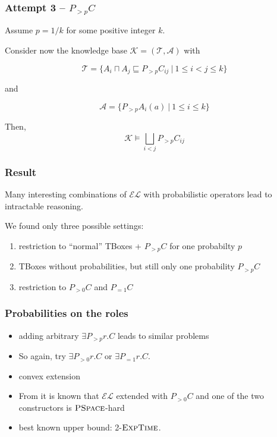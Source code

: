\documentclass[draft]{beamer}
\newcommand{\el}{\ensuremath{\mathcal{EL}}\xspace}
\newcommand{\exptime}{\ensuremath{\textsc{ExpTime}}\xspace}
\newcommand{\pspace}{\ensuremath{\textsc{PSpace}}\xspace}
\begin{document}
\begin{frame}
  \frametitle{Attempt 3 -- $P_{>p}C$}
  Assume $p=1/k$ for some positive integer $k$.

  Consider now the knowledge base $\mathcal K=(\mathcal T, \mathcal A)$ with

  $$\mathcal T=\{A_i\sqcap A_j\sqsubseteq P_{>p}C_{ij}~|~1\leq i<j\leq k\}$$

  and 

  $$\mathcal A=\{P_{>p}A_i(a)~|~1\leq i\leq k\}$$
  

  \pause
  Then, $$\mathcal K \models \bigsqcup_{i<j}P_{>p}C_{ij}$$
\end{frame}


\begin{frame}
  \frametitle{Result}
  Many interesting combinations of $\el$ with 
  probabilistic operators lead to intractable reasoning. 

  We found only three possible settings:

  \begin{enumerate}
    \item restriction to ``normal'' TBoxes + $P_{>p}C$ for one probabilty $p$
    \item TBoxes without probabilities, but still only one probability $P_{>p}C$
    \item restriction to $P_{>0}C$ and $P_{=1}C$
  \end{enumerate}
\end{frame}


\begin{frame}
  \frametitle{Probabilities on the roles}
  \begin{itemize}
    \item adding arbitrary $\exists P_{>p}r.C$ leads to similar problems 
    \item So again, try $\exists P_{>0}r.C$ or $\exists P_{=1}r.C$. 
    \item convex extension
    \item From \cite{ls} it is known that \el extended with $P_{>0}C$ and one of the two constructors is \pspace-hard
    \item best known upper bound: 2-$\exptime$.
  \end{itemize}
\end{frame}
\end{document}
